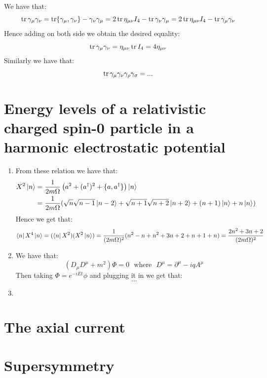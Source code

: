 \documentclass[10pt,a4paper]{article}
\begin{document}
We have that:
\[
\tr \gamma_\mu \gamma_\nu = \tr {\gamma_\mu, \gamma_\nu} - \gamma_\nu \gamma_\mu = 2 \tr \eta_{\mu \nu} I_4 - \tr \gamma_\nu \gamma_\mu = 2 \tr \eta_{\mu \nu} I_4 - \tr \gamma_\mu \gamma_\nu
\]
Hence adding on both side we obtain the desired equality:
\[
\tr \gamma_\mu \gamma_\nu = \eta_{\mu \nu} \tr I_4 = 4 \eta_{\mu \nu}
\]
Similarly we have that:
\[
\tr \gamma_\mu \gamma_\nu \gamma_\rho \gamma_\sigma = ... 
\]

\section{Energy levels of a relativistic charged spin-0 particle in a harmonic electrostatic potential}

\begin{enumerate}


\item From these relation we have that:
\begin{align*}
X^2 \ket{n} &= \frac{1}{2 m \Omega} \left( a^2 + (a^\dagger)^2 + \{a, a^\dagger\} \right)\ket{n} \\
&= \frac{1}{2m \Omega} (\sqrt{n}\sqrt{n-1} \ket{n-2} + \sqrt{n+1}\sqrt{n+2} \ket{n+2} + (n+1)\ket{n} + n\ket{n})
\end{align*}
Hence we get that:
\[
\bra{n} X^4 \ket{n} = (\bra{n} X^2)(X^2 \ket{n}) = \frac{1}{(2 m \Omega)^2} (n^2 - n + n^2 + 3n + 2 + n + 1 + n) = \frac{2n^2 + 3n + 2}{(2m \Omega)^2}
\]

\item We have that:
\[
(D_\mu D^\mu + m^2) \Phi = 0 \mbox{~~where~~} D^\mu = \partial^\mu - i q A^\mu
\]
Then taking $\Phi = e^{- i E t} \phi$ and plugging it in we get that:
\[
...
\]

\item 

\end{enumerate}

\section{The axial current}

\section{Supersymmetry}
\end{document}
